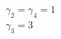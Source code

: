 \documentclass[preview]{standalone}
\begin{document}
\begin{center}
$\gamma_2 = \gamma_4 = 1$\\$\gamma_3 = 3$
\end{center}
\end{document}
